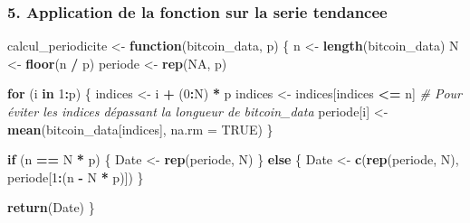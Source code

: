 \documentclass[
]{article}
\newenvironment{Shaded}{\begin{snugshade}}{\end{snugshade}}
\newcommand{\AttributeTok}[1]{\textcolor[rgb]{0.13,0.29,0.53}{#1}}
\newcommand{\CommentTok}[1]{\textcolor[rgb]{0.56,0.35,0.01}{\textit{#1}}}
\newcommand{\ConstantTok}[1]{\textcolor[rgb]{0.56,0.35,0.01}{#1}}
\newcommand{\ControlFlowTok}[1]{\textcolor[rgb]{0.13,0.29,0.53}{\textbf{#1}}}
\newcommand{\DecValTok}[1]{\textcolor[rgb]{0.00,0.00,0.81}{#1}}
\newcommand{\FunctionTok}[1]{\textcolor[rgb]{0.13,0.29,0.53}{\textbf{#1}}}
\newcommand{\NormalTok}[1]{#1}
\newcommand{\OtherTok}[1]{\textcolor[rgb]{0.56,0.35,0.01}{#1}}
\newcommand{\SpecialCharTok}[1]{\textcolor[rgb]{0.81,0.36,0.00}{\textbf{#1}}}
\begin{document}
\subsubsection{5. Application de la fonction sur la serie
tendancee}\label{application-de-la-fonction-sur-la-serie-tendancee}

\begin{Shaded}
\begin{Highlighting}[]
\NormalTok{calcul\_periodicite }\OtherTok{\textless{}{-}} \ControlFlowTok{function}\NormalTok{(bitcoin\_data, p) \{}
\NormalTok{  n }\OtherTok{\textless{}{-}} \FunctionTok{length}\NormalTok{(bitcoin\_data)}
\NormalTok{  N }\OtherTok{\textless{}{-}} \FunctionTok{floor}\NormalTok{(n }\SpecialCharTok{/}\NormalTok{ p)}
\NormalTok{  periode }\OtherTok{\textless{}{-}} \FunctionTok{rep}\NormalTok{(}\ConstantTok{NA}\NormalTok{, p)}
  
  \ControlFlowTok{for}\NormalTok{ (i }\ControlFlowTok{in} \DecValTok{1}\SpecialCharTok{:}\NormalTok{p) \{}
\NormalTok{    indices }\OtherTok{\textless{}{-}}\NormalTok{ i }\SpecialCharTok{+}\NormalTok{ (}\DecValTok{0}\SpecialCharTok{:}\NormalTok{N) }\SpecialCharTok{*}\NormalTok{ p}
\NormalTok{    indices }\OtherTok{\textless{}{-}}\NormalTok{ indices[indices }\SpecialCharTok{\textless{}=}\NormalTok{ n]  }\CommentTok{\# Pour éviter les indices dépassant la longueur de bitcoin\_data}
\NormalTok{    periode[i] }\OtherTok{\textless{}{-}} \FunctionTok{mean}\NormalTok{(bitcoin\_data[indices], }\AttributeTok{na.rm =} \ConstantTok{TRUE}\NormalTok{)}
\NormalTok{  \}}
  
  \ControlFlowTok{if}\NormalTok{ (n }\SpecialCharTok{==}\NormalTok{ N }\SpecialCharTok{*}\NormalTok{ p) \{}
\NormalTok{    Date }\OtherTok{\textless{}{-}} \FunctionTok{rep}\NormalTok{(periode, N)}
\NormalTok{  \} }\ControlFlowTok{else}\NormalTok{ \{}
\NormalTok{    Date }\OtherTok{\textless{}{-}} \FunctionTok{c}\NormalTok{(}\FunctionTok{rep}\NormalTok{(periode, N), periode[}\DecValTok{1}\SpecialCharTok{:}\NormalTok{(n }\SpecialCharTok{{-}}\NormalTok{ N }\SpecialCharTok{*}\NormalTok{ p)])}
\NormalTok{  \}}
  
  \FunctionTok{return}\NormalTok{(Date)}
\NormalTok{\}}
\end{Highlighting}
\end{Shaded}

\begin{Shaded}
\end{Shaded}
\end{document}

